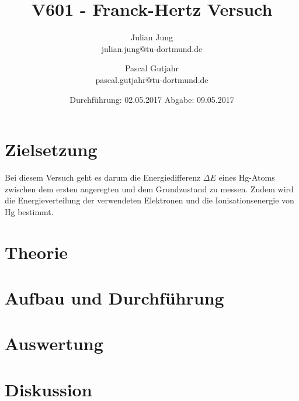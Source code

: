 

\title{V601 - Franck-Hertz Versuch}
\author{Julian Jung \\ julian.jung@tu-dortmund.de
  \and Pascal Gutjahr \\ pascal.gutjahr@tu-dortmund.de}
  \date{Durchführung: 02.05.2017
  \hspace{3em}
  Abgabe: 09.05.2017}
  
\maketitle
\newpage
\tableofcontents
\newpage
\section{Zielsetzung}
Bei diesem Versuch geht es darum die Energiedifferenz $\Delta E$ eines Hg-Atoms
zwischen dem ersten angeregten und dem Grundzustand zu messen. Zudem wird
die Energieverteilung der verwendeten Elektronen und die Ionisationsenergie
von Hg bestimmt.
\section{Theorie}
  
\section{Aufbau und Durchführung}
  
\section{Auswertung}
 
\section{Diskussion}
 
\printbibliography


